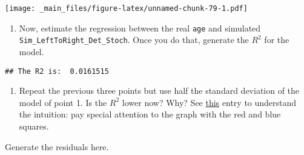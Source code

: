 \documentclass[
]{book}
\newenvironment{Shaded}{\begin{snugshade}}{\end{snugshade}}
\newcommand{\AttributeTok}[1]{\textcolor[rgb]{0.13,0.29,0.53}{#1}}
\newcommand{\CommentTok}[1]{\textcolor[rgb]{0.56,0.35,0.01}{\textit{#1}}}
\newcommand{\DecValTok}[1]{\textcolor[rgb]{0.00,0.00,0.81}{#1}}
\newcommand{\FloatTok}[1]{\textcolor[rgb]{0.00,0.00,0.81}{#1}}
\newcommand{\FunctionTok}[1]{\textcolor[rgb]{0.13,0.29,0.53}{\textbf{#1}}}
\newcommand{\NormalTok}[1]{#1}
\newcommand{\OtherTok}[1]{\textcolor[rgb]{0.56,0.35,0.01}{#1}}
\newcommand{\SpecialCharTok}[1]{\textcolor[rgb]{0.81,0.36,0.00}{\textbf{#1}}}
\newcommand{\StringTok}[1]{\textcolor[rgb]{0.31,0.60,0.02}{#1}}
\providecommand{\tightlist}{%
  \setlength{\itemsep}{0pt}\setlength{\parskip}{0pt}}
\begin{document}
\texttt{[image: \_main\_files/figure-latex/unnamed-chunk-79-1.pdf]}

\begin{enumerate}
\def\labelenumi{\arabic{enumi}.}
\setcounter{enumi}{3}
\tightlist
\item
  Now, estimate the regression between the real \texttt{age} and simulated \texttt{Sim\_LeftToRight\_Det\_Stoch}. Once you do that, generate the \(R^2\) for the model.
\end{enumerate}

\begin{Shaded}
\end{Shaded}

\begin{verbatim}
## The R2 is:  0.0161515
\end{verbatim}

\begin{enumerate}
\def\labelenumi{\arabic{enumi}.}
\setcounter{enumi}{4}
\tightlist
\item
  Repeat the previous three points but use half the standard deviation of the model of point 1. Is the \(R^2\) lower now? Why? See \href{https://en.wikipedia.org/wiki/Coefficient_of_determination}{this} entry to understand the intuition: pay special attention to the graph with the red and blue squares.
\end{enumerate}

Generate the residuals here.

\begin{Shaded}
\end{Shaded}
\end{document}
